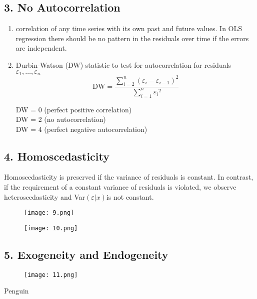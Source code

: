 \documentclass{article}
\begin{document}
\subsection*{3. No Autocorrelation}
\begin{enumerate}
    \item correlation of any time series with its own past and future values. In OLS regression
    there should be no pattern in the residuals over time if the errors are independent.
    \item Durbin-Watson (DW) statistic to test for autocorrelation for residuals $\varepsilon_1, \dots, \varepsilon_n$
    \begin{equation} 
        \text{DW} = \dfrac{\sum_{i=2}^{n}(\varepsilon_i - \varepsilon_{i-1})^2}{ \sum_{i=1}^{n} {\varepsilon_{i}}^2}
    \end{equation}

    DW = 0 (perfect positive correlation)\\
    DW = 2 (no autocorrelation) \\
    DW = 4 (perfect negative autocorrelation)
\end{enumerate}

\subsection*{4. Homoscedasticity}
Homoscedasticity is preserved if the variance of residuals is constant. In contrast, if the requirement of a
constant variance of residuals is violated, we observe heteroscedasticity and Var$(\varepsilon|x)$is not constant.

\begin{figure}[h]
	\centering 
	\texttt{[image: 9.png]}
\end{figure}

\begin{figure}[h]
	\centering 
	\texttt{[image: 10.png]}
\end{figure}

\newpage
\subsection*{5. Exogeneity and Endogeneity}
\begin{figure}[h]
	\centering 
	\texttt{[image: 11.png]}
\end{figure}
\vfill
Penguin
\end{document}

